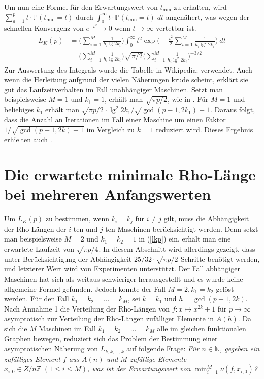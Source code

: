 \documentclass[a4paper, 10pt, ngerman]{article}
\newcommand{\N}{\mathbb{N}}
\newcommand{\Z}{\mathbb{Z}}
\renewcommand{\P}{\mathbb{P}}
\begin{document}
Um nun eine Formel für den Erwartungswert von $t_{\min}$ zu erhalten, wird $\sum_{a = 1}^p t \cdot \P(t_{\min} = t)$ durch $\int_{0}^\infty t \cdot \P(t_{\min} = t) \; dt$ angenähert, was wegen der schnellen Konvergenz von $e^{-t^2} \to 0$ wenn $t \to \infty$ vertetbar ist.
\begin{align}
    L_K(p)
     & = \Bigg ( \sum_{i = 1}^M \frac 1 {h_i \lg 2k_i} \Bigg ) \int_{0}^{\infty} t^2 \exp \Bigg (- \frac {t^2} 2 \sum_{i = 1}^M \frac 1 {h_i \lg^2 2k_i} \Bigg ) \ dt \nonumber \\
     & = \Bigg ( \sum_{i = 1}^M \frac 1 {h_i \lg 2k_i} \Bigg ) \sqrt {\pi/2} \Bigg (\sum_{i = 1}^M \frac 1 {h_i \lg^2 2k_i} \Bigg )^{-3/2}
    \label{lkp}
\end{align}
Zur Auswertung des Integrals wurde die Tabelle in Wikipedia: \cite{gint} verwendet. Auch wenn die Herleitung aufgrund der vielen Näherungen krude scheint, erklärt sie gut das Laufzeitverhalten im Fall unabhängiger Maschinen. Setzt man beispielsweise $M = 1$ und $k_1 = 1$, erhält man $\sqrt{\pi p / 2}$, wie in \cite{pol75}. Für $M = 1$ und beliebiges $k_1$ erhält man $\sqrt{\pi p / 2} \cdot \lg^2 2k_1 / \sqrt{\gcd(p-1, 2k_1) - 1}$. Daraus folgt, dass die Anzahl an Iterationen im Fall einer Maschine um einen Faktor $1/\sqrt{\gcd(p - 1, 2k) - 1}$ im Vergleich zu $k = 1$ reduziert wird. Dieses Ergebnis erhielten auch \cite{bp81}.

\section{Die erwartete minimale Rho-Länge bei mehreren Anfangswerten}

Um $L_K(p)$ zu bestimmen, wenn $k_i = k_j$ für $i \ne j$ gilt, muss die Abhängigkeit der Rho-Längen der $i$-ten und $j$-ten Maschinen berücksichtigt werden. Denn setzt man beispielsweise $M = 2$ und $k_1 = k_2 = 1$ in (\ref{lkp}) ein, erhält man eine erwartete Laufzeit von $\sqrt {\pi p / 4}$. In diesem Abschnitt wird allerdings gezeigt, dass unter Berücksichtigung der Abhängigkeit $25/32 \cdot \sqrt{\pi p / 2}$ Schritte benötigt werden, und letzterer Wert wird von Experimenten unterstützt. Der Fall abhängiger Maschinen hat sich als weitaus schwieriger herausgestellt und es wurde keine allgemeine Formel gefunden. Jedoch konnte der Fall $M = 2, k_1 = k_2$ gelöst werden. Für den Fall $k_1 = k_2 = \dots = k_M$, sei $k = k_1$ und $h = \gcd(p - 1, 2k)$. Nach Annahme 1 die Verteilung der Rho-Längen von $f : x \mapsto x^{2k} + 1$ für $p \to \infty$ asymptotisch zur Verteilung der Rho-Längen zufälliger Elemente in $A(h)$. Da sich die $M$ Maschinen im Fall $k_1 = k_2 = \dots = k_M$ alle im gleichen funktionalen Graphen bewegen, reduziert sich das Problem der Bestimmung einer asymptotischen Näherung von $L_{k, k, \dots, k}$ auf folgende Frage: \emph{Für $n \in \N$, gegeben ein zufälliges Element $f$ aus $A(n)$ und $M$ zufällige Elemente $x_{i, 0} \in Z/n\Z \; (1 \le i \le M)$, was ist der Erwartungswert von $\min_{i = 1}^M \nu(f, x_{i, 0})$?}
\end{document}
